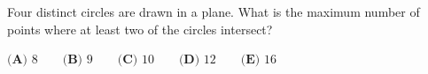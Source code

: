 Four distinct circles are drawn in a plane. What is the maximum number of points where at least two of the circles intersect?

$\textbf{(A) } 8\qquad \textbf{(B) } 9\qquad \textbf{(C) } 10\qquad \textbf{(D) } 12\qquad \textbf{(E) } 16$
